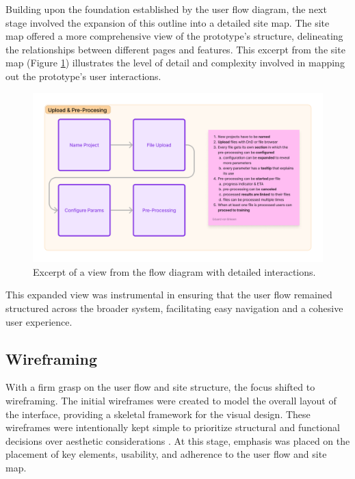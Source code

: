 Building upon the foundation established by the user flow diagram, the next stage involved the expansion of this outline into a detailed site map.
The site map offered a more comprehensive view of the prototype's structure, delineating the relationships between different pages and features.
This excerpt from the site map (Figure \ref{fig:design:flow-2}) illustrates the level of detail and complexity involved in mapping out the prototype's user interactions.

\begin{figure}[htb]
  \centering
  \includegraphics[width=.8\textwidth]{figures/flow-2.png}
  \caption{Excerpt of a view from the flow diagram with detailed interactions.}
  \label{fig:design:flow-2}
\end{figure}

This expanded view was instrumental in ensuring that the user flow remained structured across the broader system, facilitating easy navigation and a cohesive user experience.

\subsection*{Wireframing}

With a firm grasp on the user flow and site structure, the focus shifted to wireframing. The initial wireframes were created to model the overall layout of the interface, providing a skeletal framework for the visual design. These wireframes were intentionally kept simple to prioritize structural and functional decisions over aesthetic considerations .
At this stage, emphasis was placed on the placement of key elements, usability, and adherence to the user flow and site map.

